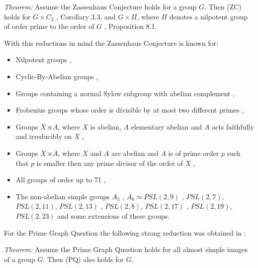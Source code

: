 \documentclass[a4paper,11pt]{report}
\begin{document}
{{ \emph{Theorem:} Assume the Zassenhaus Conjecture holds for a group $G$. Then (ZC) holds for $G \times C_2$ \cite{HoefertKimmerle}, Corollary 3.3, and $G \times \Pi$, where $\Pi$ denotes a nilpotent group of order prime to the order of $G$ \cite{HertweckEdinb}, Proposition 8.1.

 With this reductions in mind the Zassenhaus Conjecture is known for: 
\begin{itemize}
\item  Nilpotent groups \cite{Weiss91}, 
\item  Cyclic-By-Abelian groups \cite{CyclicByAbelian}, 
\item  Groups containing a normal Sylow subgroup with abelian complement \cite{HertweckColloq}, 
\item  Frobenius groups whose order is divisible by at most two different primes \cite{JuriaansMilies}, 
\item  Groups $X \rtimes A$, where $X$ is abelian, $A$ elementary abelian and $A$ acts faithfully and irreducibly on $X$ \cite{SehgalWeiss}, 
\item  Groups $X \rtimes A$, where $X$ and $A$ are abelian and $A$ is of prime order $p$ such that $p$ is smaller then any prime divisor of the order of $X$ \cite{MRSW}, 
\item  All groups of order up to 71 \cite{HoefertKimmerle}, 
\item  The non-abelian simple groups $A_5$ \cite{LP}, $A_6 \simeq PSL(2,9)$ \cite{HerA6}, $PSL(2,7)$, $PSL(2,11)$, $PSL(2,13)$ \cite{HertweckBrauer}, $PSL(2,8)$, $PSL(2,17)$ \cite{KonovalovKimmiStAndrews} \cite{Gildea}, $PSL(2,19)$, $PSL(2,23)$ \cite{BaMaM10} and some extensions of these groups. 
\end{itemize}
 For the Prime Graph Question the following strong reduction was obtained in \cite{KonovalovKimmiStAndrews}: 

 \emph{Theorem:} Assume the Prime Graph Question holds for all almost simple images of a group $G$. Then (PQ) also holds for $G.$

}}
\end{document}
